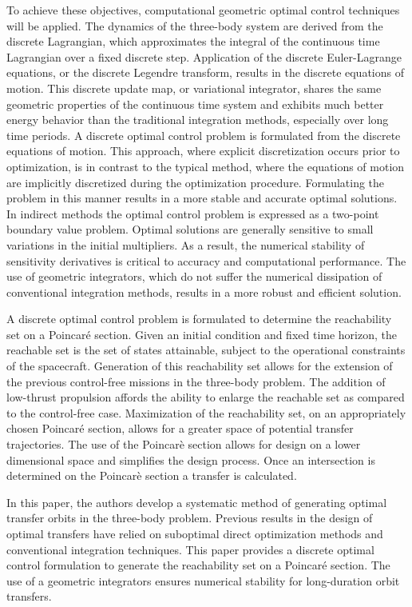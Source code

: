 \documentclass[letterpaper, preprint, paper,11pt]{AAS}	%
\begin{document}
To achieve these objectives, computational geometric optimal control techniques will be applied. 
The dynamics of the three-body system are derived from the discrete Lagrangian, which approximates the integral of the continuous time Lagrangian over a fixed discrete step.
Application of the discrete Euler-Lagrange equations, or the discrete Legendre transform, results in the discrete equations of motion.
This discrete update map, or variational integrator, shares the same geometric properties of the continuous time system and exhibits much better energy behavior than the traditional integration methods, especially over long time periods.
A discrete optimal control problem is formulated from the discrete equations of motion.
This approach, where explicit discretization occurs prior to optimization,  is in contrast to the typical method, where the equations of motion are implicitly discretized during the optimization procedure.
Formulating the problem in this manner results in a more stable and accurate optimal solutions. 
In indirect methods the optimal control problem is expressed as a two-point boundary value problem.
Optimal solutions are generally sensitive to small variations in the initial multipliers.
As a result, the numerical stability of sensitivity derivatives is critical to accuracy and computational performance. 
The use of geometric integrators, which do not suffer the numerical dissipation of conventional integration methods, results in a more robust and efficient solution.

A discrete optimal control problem is formulated to determine the reachability set on a Poincar\'e section.
Given an initial condition and fixed time horizon, the reachable set is the set of states attainable, subject to the operational constraints of the spacecraft. 
Generation of this reachability set allows for the extension of the previous control-free missions in the three-body problem. 
The addition of low-thrust propulsion affords the ability to enlarge the reachable set as compared to the control-free case.
Maximization of the reachability set, on an appropriately chosen Poincar\'e section, allows for a greater space of potential transfer trajectories.
The use of the Poincar\`e section allows for design on a lower dimensional space and simplifies the design process.
Once an intersection is determined on the Poincar\`e section a transfer is calculated.

In this paper, the authors develop a systematic method of generating optimal transfer orbits in the three-body problem.
Previous results in the design of optimal transfers have relied on suboptimal direct optimization methods and conventional integration techniques.
This paper provides a discrete optimal control formulation to generate the reachability set on a Poincar\'e section.
The use of a geometric integrators ensures numerical stability for long-duration orbit transfers.
\end{document}
